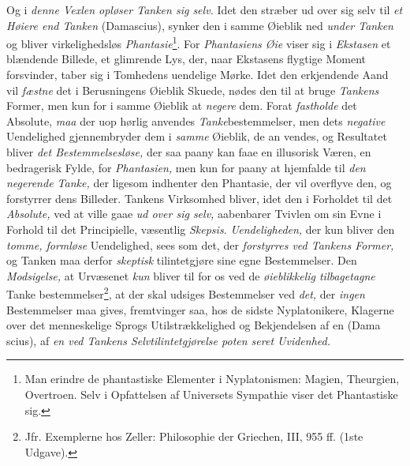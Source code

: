 Og i \emph{denne Vexlen opløser Tanken sig selv.} Idet
den stræber ud over sig selv til \emph{et Høiere end Tanken}
(Damascius), synker den i samme Øieblik ned \emph{under Tanken}
og bliver virkelighedsløs \emph{Phantasie}\footnote{Man erindre de phantastiske Elementer i Nyplatonismen: Magien,
Theurgien, Overtroen. Selv i Opfattelsen af Universets Sympathie
viser det Phantastiske sig.}. For \emph{Phantasiens
Øie} viser sig i \emph{Ekstasen} et blændende Billede, et glimrende
Lys, der, naar Ekstasens flygtige Moment forsvinder, taber sig
i Tomhedens uendelige Mørke. Idet den erkjendende Aand
vil \emph{fæstne} det i Berusningens Øieblik Skuede, nødes den til
at bruge \emph{Tankens} Former, men kun for i samme Øieblik at
\emph{negere} dem. Forat \emph{fastholde} det Absolute, \emph{maa} der uop\-%
hørlig anvendes \emph{Tanke}bestemmelser, men dets \emph{negative}
Uendelighed gjennembryder dem i \emph{samme} Øieblik, de an\-%
vendes, og Resultatet bliver \emph{det Bestemmelsesløse,} der
 \setcounter{footnote}{0}
saa paany kan faae en illusorisk Væren, en bedragerisk Fylde,
for \emph{Phantasien,} men kun for paany at hjemfalde til \emph{den
negerende Tanke,} der ligesom indhenter den Phantasie,
der vil overflyve den, og forstyrrer dens Billeder. Tankens
Virksomhed bliver, idet den i Forholdet til det \emph{Absolute,}
ved at ville gaae \emph{ud over sig selv,} aabenbarer Tvivlen om
sin Evne i Forhold til det Principielle, væsentlig \emph{Skepsis.}
\emph{Uendeligheden,} der kun bliver den \emph{tomme, formløse}
Uendelighed, sees som det, der \emph{forstyrres ved Tankens
Former,} og Tanken maa derfor \emph{skeptisk} tilintetgjøre sine
egne Bestemmelser. Den \emph{Modsigelse,} at Urvæsenet \emph{kun}
bliver til for os ved de \emph{øieblikkelig tilbagetagne} Tanke\-%
bestemmelser\footnote{Jfr. Exemplerne hos Zeller: Philosophie der Griechen, III, 955 ff.
(1ste Udgave).}, at der skal udsiges Bestemmelser ved \emph{det,}
der \emph{ingen} Bestemmelser maa gives, fremtvinger saa, hos de
sidste Nyplatonikere, Klagerne over det menneskelige Sprogs
Utilstrækkelighed og Bekjendelsen af en  (Dama\-%
scius), af \emph{en ved Tankens Selvtilintetgjørelse poten\-%
seret Uvidenhed.}

